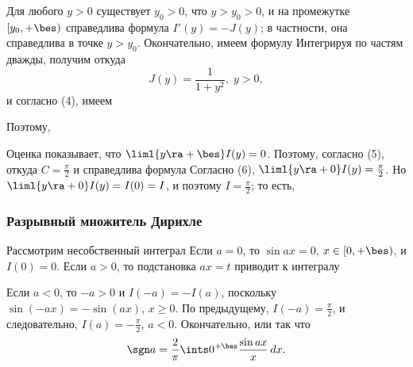 \documentclass[a4paper]{article}
\begin{document}
Для любого $y>0$ существует $y_0>0$, что $y>y_0>0$, и на промежутке
$[y_0,+\bes)$ справедлива формула $I'(y) = -J(y)$; в частности, она
справедлива в точке $y>y_0$. Окончательно, имеем формулу
 Интегрируя по частям дважды, получим
 откуда
$$J(y) = \frac1{1+y^2}, \; y>0,$$ и согласно (4), имеем

Поэтому, 

Оценка  показывает, что $\liml{y\ra+\bes} I(y)
= 0$. Поэтому, согласно (5),  откуда
$C=\frac{\pi}2$ и справедлива формула  Согласно (6), $\liml{y\ra+0} I(y) =
\frac{\pi}2$. Но $\liml{y\ra+0} I(y) =I(0) = I$, и поэтому
$I=\frac{\pi}2$; то есть, 

\subsubsection{Разрывный множитель Дирихле}

Рассмотрим несобственный интеграл  Если $a=0$, то $\sin ax=0$,
$x\in[0,+\bes)$, и $I(0)=0$. Если $a>0$, то подстановка $ax=t$
приводит к интегралу 

Если $a<0$, то $-a>0$ и $I(-a)=-I(a)$, поскольку
$\sin(-ax)=-\sin(ax)$, $x\ge0$. По предыдущему, $I(-a)=\frac{\pi}2$,
и следовательно, $I(a)=-\frac{\pi}2$, $a<0$. Окончательно,
 или  так что $$\sgn a = \frac2{\pi} \ints0^{+\bes}
\frac{\sin ax}x\,dx.$$
\end{document}
